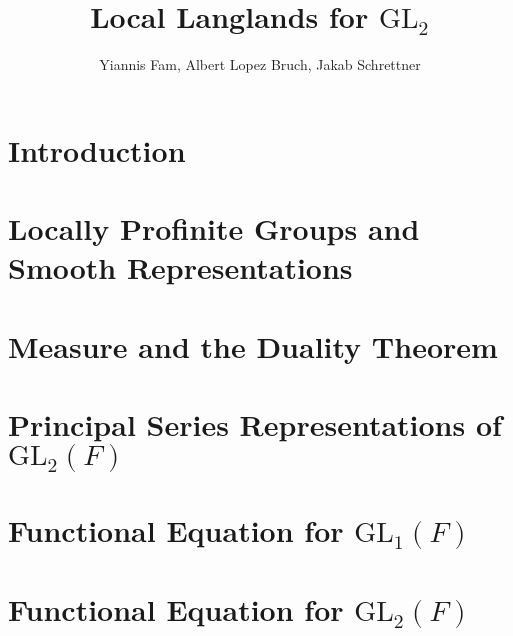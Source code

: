 \documentclass{article}
\title{Local Langlands for $\mathrm{GL}_2$}
\author{Yiannis Fam, Albert Lopez Bruch, Jakab Schrettner}
\newcommand{\GL}{\mathrm{GL}}
\theoremstyle{plain}
\theoremstyle{definition}
\begin{document}
	\maketitle
	\thispagestyle{empty}
	\tableofcontents
	\thispagestyle{empty}
	\newpage

	\setcounter{page}{1}
\section{Introduction}

\section{Locally Profinite Groups and Smooth Representations}\label{sec:lpg}

\section{Measure and the Duality Theorem}\label{sec:measure}






\section{Principal Series Representations of \texorpdfstring{$\GL_2(F)$}{TEXT}}\label{sec:principal}






\section{Functional Equation for \texorpdfstring{$\GL_1(F)$}{TEXT}}\label{sec:func_equation}


\section{Functional Equation for \texorpdfstring{$\GL_2(F)$}{TEXT}}\label{chap:LfuncGL2}


\iffalse
\section{Functional Equation}

\fi
\end{document}
